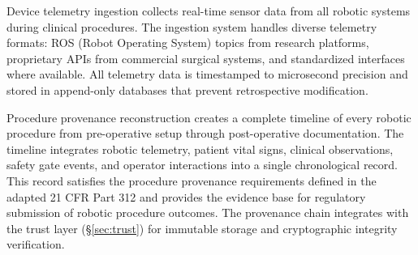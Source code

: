 Device telemetry ingestion collects real-time sensor data from all robotic systems during
clinical procedures. The ingestion system handles diverse telemetry formats: ROS
(Robot Operating System) topics from research platforms, proprietary APIs from commercial
surgical systems, and standardized interfaces where available. All telemetry data is
timestamped to microsecond precision and stored in append-only databases that prevent
retrospective modification.

Procedure provenance reconstruction creates a complete timeline of every robotic procedure
from pre-operative setup through post-operative documentation. The timeline integrates
robotic telemetry, patient vital signs, clinical observations, safety gate events, and
operator interactions into a single chronological record. This record satisfies the
procedure provenance requirements defined in the adapted 21 CFR Part 312 \cite{cfr312-adapt}
and provides the evidence base for regulatory submission of robotic procedure outcomes.
The provenance chain integrates with the trust layer (\S\ref{sec:trust}) for immutable
storage and cryptographic integrity verification.
